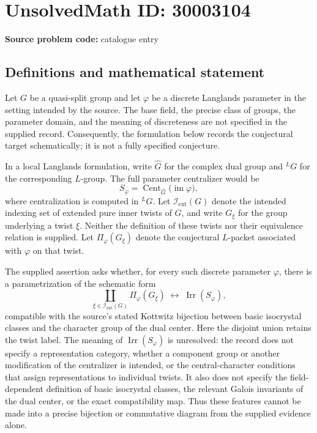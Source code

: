 \documentclass[11pt]{article}
\begin{document}
\section*{UnsolvedMath ID: 30003104}
\textbf{Source problem code:} catalogue entry
\subsection{Definitions and mathematical statement}
Let \(G\) be a quasi-split group and let \(\varphi\) be a discrete Langlands parameter in the setting intended by the source. The base field, the precise class of groups, the parameter domain, and the meaning of discreteness are not specified in the supplied record. Consequently, the formulation below records the conjectural target schematically; it is not a fully specified conjecture.

In a local Langlands formulation, write \(\widehat G\) for the complex dual group and \({}^{L}G\) for the corresponding \(L\)-group. The full parameter centralizer would be
\[
S_{\varphi}=\operatorname{Cent}_{\widehat G}\bigl(\operatorname{im}\varphi\bigr),
\]
where centralization is computed in \({}^{L}G\). Let \(\mathcal I_{\mathrm{ext}}(G)\) denote the intended indexing set of extended pure inner twists of \(G\), and write \(G_{\xi}\) for the group underlying a twist \(\xi\). Neither the definition of these twists nor their equivalence relation is supplied. Let \(\Pi_{\varphi}(G_{\xi})\) denote the conjectural \(L\)-packet associated with \(\varphi\) on that twist.

The supplied assertion asks whether, for every such discrete parameter \(\varphi\), there is a parametrization of the schematic form
\[
\coprod_{\xi\in\mathcal I_{\mathrm{ext}}(G)}
\Pi_{\varphi}(G_{\xi})
\;\longleftrightarrow\;
\operatorname{Irr}(S_{\varphi}),
\]
compatible with the source's stated Kottwitz bijection between basic isocrystal classes and the character group of the dual center. Here the disjoint union retains the twist label. The meaning of \(\operatorname{Irr}(S_{\varphi})\) is unresolved: the record does not specify a representation category, whether a component group or another modification of the centralizer is intended, or the central-character conditions that assign representations to individual twists. It also does not specify the field-dependent definition of basic isocrystal classes, the relevant Galois invariants of the dual center, or the exact compatibility map. Thus these features cannot be made into a precise bijection or commutative diagram from the supplied evidence alone.
\end{document}
